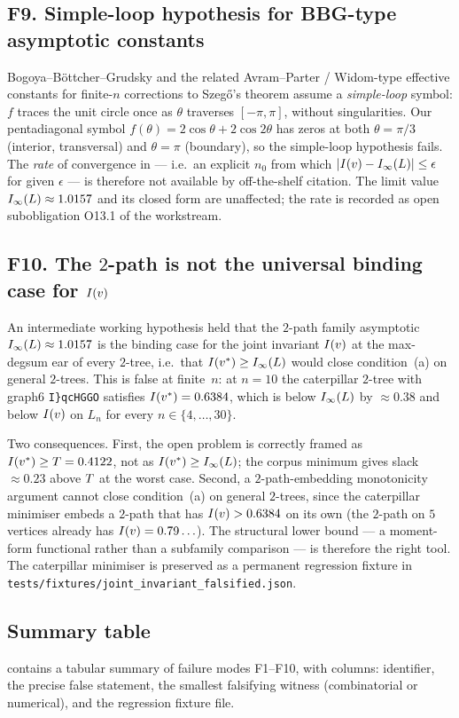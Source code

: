 \subsection{F9. Simple-loop hypothesis for BBG-type asymptotic constants}
\label{sec:fm:simple-loop}

Bogoya--B\"ottcher--Grudsky \cite{BBG2015} and the related
Avram--Parter / Widom-type effective constants for finite-$n$
corrections to Szeg\H{o}'s theorem assume a \emph{simple-loop} symbol:
$f$ traces the unit circle once as $\theta$ traverses $[-\pi, \pi]$,
without singularities. Our pentadiagonal symbol
$f(\theta) = 2\cos\theta + 2\cos 2\theta$ has zeros at both
$\theta = \pi/3$ (interior, transversal) and $\theta = \pi$ (boundary),
so the simple-loop hypothesis fails. The \emph{rate} of convergence in
 — i.e.\ an explicit $n_{0}$ from which
$|I(v) - I_{\infty}(L)| \le \epsilon$ for given $\epsilon$ — is therefore not
available by off-the-shelf citation. The limit value
$I_{\infty}(L) \approx 1.0157$ and its closed form are unaffected; the rate
is recorded as open subobligation O13.1 of the workstream.

\subsection{F10. The $2$-path is not the universal binding case for
\texorpdfstring{$I(v)$}{I(v)}}\label{sec:fm:not-binding}

An intermediate working hypothesis held that the $2$-path family
asymptotic $I_{\infty}(L) \approx 1.0157$ is the binding case for the joint
invariant $I(v)$ at the max-degsum ear of every $2$-tree, i.e.\ that
$I(v^{*}) \ge I_{\infty}(L)$ would close condition~(a) on general $2$-trees.
This is false at finite~$n$: at $n = 10$ the caterpillar $2$-tree
with graph6 \texttt{I\}qcHG\textasciigrave GO} satisfies
$I(v^{*}) = 0.6384$, which is below $I_{\infty}(L)$ by $\approx 0.38$ and below
$I(v)$ on $L_{n}$ for every $n \in \{4, \ldots, 30\}$.

Two consequences. First, the open problem  is
correctly framed as $I(v^{*}) \ge T = 0.4122$, not as
$I(v^{*}) \ge I_{\infty}(L)$; the corpus minimum gives slack $\approx 0.23$
above $T$ at the worst case. Second, a $2$-path-embedding
monotonicity argument cannot close condition~(a) on general $2$-trees,
since the caterpillar minimiser embeds a $2$-path that has
$I(v) > 0.6384$ on its own (the $2$-path on $5$ vertices already has
$I(v) = 0.79\ldots$). The structural lower bound 
— a moment-form functional rather than a subfamily comparison — is
therefore the right tool. The caterpillar minimiser is preserved as a
permanent regression fixture in
\texttt{tests/fixtures/joint\_invariant\_falsified.json}.

\subsection{Summary table}\label{sec:fm:summary}

 contains a tabular summary of failure modes
F1--F10, with columns: identifier, the precise false statement,
the smallest falsifying witness (combinatorial or numerical), and the
regression fixture file.
